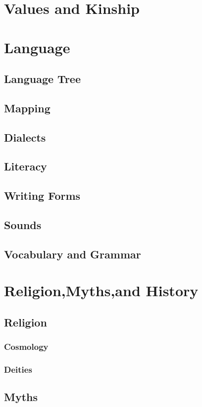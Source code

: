\section{Values and Kinship}

\section{Language}
\subsection{Language Tree}
\subsection{Mapping}
\subsection{Dialects}
\subsection{Literacy}
\subsection{Writing Forms}
\subsection{Sounds}
\subsection{Vocabulary and Grammar}

\section{Religion,Myths,and History}
\subsection{Religion}
\subsubsection{Cosmology}
\subsubsection{Deities}
\subsection{Myths}
